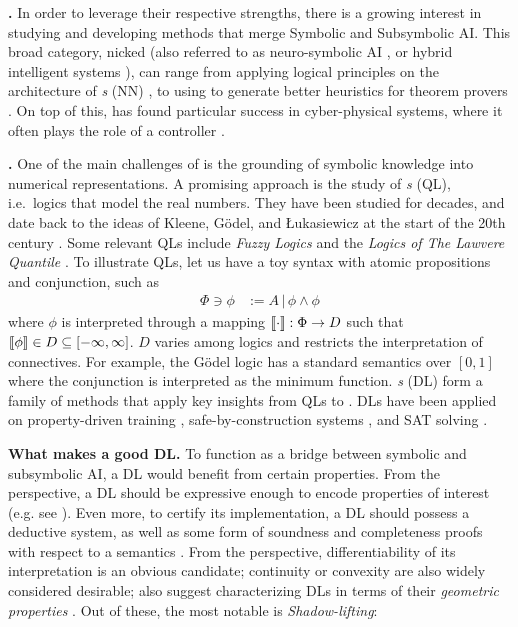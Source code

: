 \textbf{\InAI{}.} In order to leverage their respective strengths, there is a growing interest in studying and developing methods that merge Symbolic and Subsymbolic AI. This broad category, nicked \emph{\InAI{}}  \citep{Platzer_2024} (also referred to as neuro-symbolic AI \citep{d2009neural}, or hybrid intelligent systems \citep{medsker2012hybrid}), can range from applying logical principles on the architecture of \emph{ \NN{}s} (NN)  \citep{badreddine2022logic, petersen2022deep}, to using \SuAI{} to generate better heuristics for theorem provers \citep{laurent2022learning}. On top of this, \InAI{} has found particular success in cyber-physical systems, where it often plays the role of a controller \citep{Platzer_2024}.

\textbf{\DL{}.} One of the main challenges of \InAI{} is the grounding of symbolic knowledge into numerical representations. A promising approach is the study of \emph{\QL{}s} (QL), i.e.~logics that model the real numbers. They have been studied for decades, and date back to the ideas of Kleene, G\"{o}del, and Łukasiewicz at the start of the 20th century \citep{cintula2011handbook, prooffuzzy}. Some relevant QLs include \emph{Fuzzy Logics} \citep{cintula2011handbook} and the \emph{Logics of The Lawvere Quantile} \citep{bacci2024polynomial, bacci2023propositional, capucci2024quantifiers, bacci2025induction}. To illustrate QLs, let us have a toy syntax with atomic propositions and conjunction, such as
\begin{equation}
\begin{split}
    \Phi \ni \phi &:= A \,|\, \phi \land \phi
\end{split}
\end{equation}
where $\phi$ is interpreted through a mapping $\llbracket \cdot \rrbracket : \Phi \rightarrow D$ such that $ \llbracket \phi \rrbracket \in D \subseteq [-\infty,\infty]$. $D$ varies among logics and restricts the interpretation of connectives. For example, the
G\"{o}del logic \citep{BAAZ200723} has a standard semantics over $[0, 1]$ where the conjunction is interpreted as the minimum function. \emph{\DL{}s} (DL) form a family of methods that apply key insights from QLs to \InAI{}. DLs have been applied on property-driven training \citep{FLINKOW2025103280}, safe-by-construction systems \citep{badreddine2022logic}, and SAT solving \citep{kyrillidis2021continuous, gaglione2022maxsat}. 

\textbf{What makes a good DL.} To function as a bridge between symbolic and subsymbolic AI, a DL would benefit from certain properties. From the \SiAI{} perspective, a DL should be expressive enough to encode properties of interest (e.g. see \citep{vehicle}). Even more, to certify its implementation, a DL should possess a deductive system, as well as some form of soundness and completeness proofs with respect to a semantics \citep{floyd1993assigning, goguen1977initial}. From the \SuAI{} perspective, differentiability of its interpretation is an obvious candidate; continuity or convexity are also widely considered desirable; \citeauthor{varnai2020robustness} also suggest characterizing DLs in terms of their \textit{geometric properties} \citep{varnai2020robustness}. Out of these, the most notable is \emph{Shadow-lifting}:

